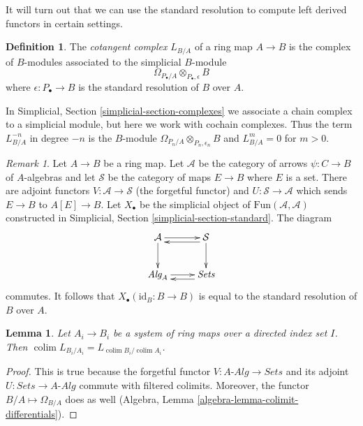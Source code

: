 \documentclass[10pt,a4paper]{amsart}
\theoremstyle{plain}
\newtheorem{lemma}[subsection]{Lemma}
\theoremstyle{definition}
\newtheorem{definition}[subsection]{Definition}
\theoremstyle{remark}
\newtheorem{remark}[subsection]{Remark}
\numberwithin{equation}{subsection}
\def\colim{\mathop{\mathrm{colim}}\nolimits}
\begin{document}
\noindent
It will turn out that we can use the standard resolution
to compute left derived functors in certain settings.

\begin{definition}
\label{definition-cotangent-complex-ring-map}
The {\it cotangent complex} $L_{B/A}$ of a ring map $A \to B$
is the complex of $B$-modules associated to the simplicial $B$-module
$$
\Omega_{P_\bullet/A} \otimes_{P_\bullet, \epsilon} B
$$
where $\epsilon : P_\bullet \to B$ is the standard resolution
of $B$ over $A$.
\end{definition}

\noindent
In Simplicial, Section \ref{simplicial-section-complexes} we associate a
chain complex to a simplicial module, but here we work with cochain complexes.
Thus the term $L_{B/A}^{-n}$ in degree $-n$ is the $B$-module
$\Omega_{P_n/A} \otimes_{P_n, \epsilon_n} B$ and $L_{B/A}^m = 0$
for $m > 0$.

\begin{remark}
\label{remark-variant-cotangent-complex}
Let $A \to B$ be a ring map. Let $\mathcal{A}$ be the category of
arrows $\psi : C \to B$ of $A$-algebras and let $\mathcal{S}$ be
the category of maps $E \to B$ where $E$ is a set. There are adjoint
functors $V : \mathcal{A} \to \mathcal{S}$ (the forgetful functor)
and $U : \mathcal{S} \to \mathcal{A}$ which sends $E \to B$ to
$A[E] \to B$. Let $X_\bullet$ be the simplicial object of
$\text{Fun}(\mathcal{A}, \mathcal{A})$ constructed in
Simplicial, Section \ref{simplicial-section-standard}.
The diagram
$$
\xymatrix{
\mathcal{A} \ar[d] \ar[r] & \mathcal{S} \ar@<1ex>[l] \ar[d] \\
\textit{Alg}_A \ar[r] & \textit{Sets} \ar@<1ex>[l]
}
$$
commutes. It follows that $X_\bullet(\text{id}_B : B \to B)$
is equal to the standard resolution of $B$ over $A$.
\end{remark}

\begin{lemma}
\label{lemma-colimit-cotangent-complex}
Let $A_i \to B_i$ be a system of ring maps over a directed index
set $I$. Then $\colim L_{B_i/A_i} = L_{\colim B_i/\colim A_i}$.
\end{lemma}

\begin{proof}
This is true because the forgetful functor
$V : A\textit{-Alg} \to \textit{Sets}$ and its adjoint
$U : \textit{Sets} \to A\textit{-Alg}$ commute with filtered colimits.
Moreover, the functor $B/A \mapsto \Omega_{B/A}$ does as well
(Algebra, Lemma \ref{algebra-lemma-colimit-differentials}).
\end{proof}
\end{document}
